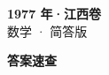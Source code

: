\documentclass[zihao=-4, a4paper]{ctexart}
\begin{document}
\begin{center}
  {\Large\bfseries 1977 年·江西卷}\\[4pt]
  {\large 数学 · 简答版}
\end{center}
\medskip
{}

\clearpage
{}
\begin{center}{\Large\bfseries 答案速查}\end{center}
\medskip

\end{document}
